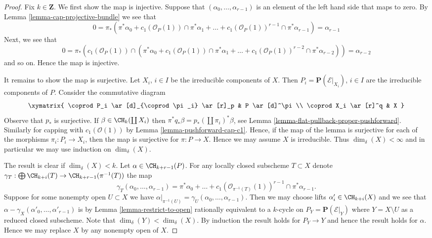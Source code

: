 \begin{proof}
Fix $k \in \mathbf{Z}$. We first show the map is injective.
Suppose that $(\alpha_0, \ldots, \alpha_{r - 1})$ is an element
of the left hand side that maps to zero.
By Lemma \ref{lemma-cap-projective-bundle} we see that
$$
0 = \pi_*(\pi^*\alpha_0 +
c_1(\mathcal{O}_P(1)) \cap \pi^*\alpha_1
+ \ldots +
c_1(\mathcal{O}_P(1))^{r - 1} \cap \pi^*\alpha_{r-1})
= \alpha_{r - 1}
$$
Next, we see that
$$
0 = \pi_*(c_1(\mathcal{O}_P(1)) \cap (\pi^*\alpha_0 +
c_1(\mathcal{O}_P(1)) \cap \pi^*\alpha_1
+ \ldots +
c_1(\mathcal{O}_P(1))^{r - 2} \cap \pi^*\alpha_{r - 2}))
= \alpha_{r - 2}
$$
and so on. Hence the map is injective.

\medskip\noindent
It remains to show the map is surjective.
Let $X_i$, $i \in I$ be the irreducible components of $X$.
Then $P_i = \mathbf{P}(\mathcal{E}|_{X_i})$, $i \in I$
are the irreducible components of $P$. Consider the commutative
diagram
$$
\xymatrix{
\coprod P_i \ar[d]_{\coprod \pi_i} \ar[r]_p & P \ar[d]^\pi \\
\coprod X_i \ar[r]^q & X
}
$$
Observe that $p_*$ is surjective. If $\beta \in \CH_k(\coprod X_i)$
then $\pi^* q_* \beta = p_*(\coprod \pi_i)^* \beta$, see
Lemma \ref{lemma-flat-pullback-proper-pushforward}. Similarly for
capping with $c_1(\mathcal{O}(1))$ by
Lemma \ref{lemma-pushforward-cap-c1}.
Hence, if the map of the lemma is surjective for each
of the morphisms $\pi_i : P_i \to X_i$, then the map is
surjective for $\pi : P \to X$. Hence we may assume $X$ is irreducible.
Thus $\dim_\delta(X) < \infty$ and in particular we may use
induction on $\dim_\delta(X)$.

\medskip\noindent
The result is clear if $\dim_\delta(X) < k$.
Let $\alpha \in \CH_{k + r - 1}(P)$.
For any locally closed subscheme $T \subset X$ denote
$\gamma_T : \bigoplus \CH_{k + i}(T) \to \CH_{k + r - 1}(\pi^{-1}(T))$
the map
$$
\gamma_T(\alpha_0, \ldots, \alpha_{r - 1})
= \pi^*\alpha_0 + \ldots +
c_1(\mathcal{O}_{\pi^{-1}(T)}(1))^{r - 1} \cap \pi^*\alpha_{r - 1}.
$$
Suppose for some nonempty open $U \subset X$ we have
$\alpha|_{\pi^{-1}(U)} = \gamma_U(\alpha_0, \ldots, \alpha_{r - 1})$.
Then we may choose lifts $\alpha'_i \in \CH_{k + i}(X)$ and we
see that $\alpha - \gamma_X(\alpha'_0, \ldots, \alpha'_{r - 1})$
is by Lemma \ref{lemma-restrict-to-open}
rationally equivalent to a $k$-cycle on $P_Y = \mathbf{P}(\mathcal{E}|_Y)$
where $Y = X \setminus U$ as a reduced closed subscheme.
Note that $\dim_\delta(Y) < \dim_\delta(X)$.
By induction the result holds
for $P_Y \to Y$ and hence the result holds for $\alpha$.
Hence we may replace $X$ by any nonempty open of $X$.


\end{proof}
